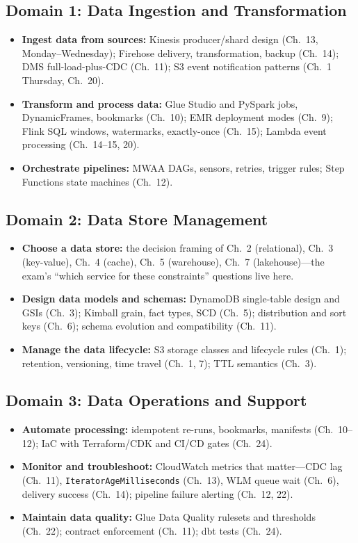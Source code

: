 \subsection{Domain 1: Data Ingestion and Transformation}
\begin{itemize}
    \item \textbf{Ingest data from sources:} Kinesis producer/shard design (Ch.~13, Monday--Wednesday);
    Firehose delivery, transformation, backup (Ch.~14); DMS full-load-plus-CDC (Ch.~11); S3 event
    notification patterns (Ch.~1 Thursday, Ch.~20).
    \item \textbf{Transform and process data:} Glue Studio and PySpark jobs, DynamicFrames,
    bookmarks (Ch.~10); EMR deployment modes (Ch.~9); Flink SQL windows, watermarks, exactly-once
    (Ch.~15); Lambda event processing (Ch.~14--15, 20).
    \item \textbf{Orchestrate pipelines:} MWAA DAGs, sensors, retries, trigger rules; Step
    Functions state machines (Ch.~12).
\end{itemize}
\subsection{Domain 2: Data Store Management}
\begin{itemize}
    \item \textbf{Choose a data store:} the decision framing of Ch.~2 (relational), Ch.~3 (key-value),
    Ch.~4 (cache), Ch.~5 (warehouse), Ch.~7 (lakehouse)---the exam's ``which service for these
    constraints'' questions live here.
    \item \textbf{Design data models and schemas:} DynamoDB single-table design and GSIs (Ch.~3);
    Kimball grain, fact types, SCD (Ch.~5); distribution and sort keys (Ch.~6); schema evolution
    and compatibility (Ch.~11).
    \item \textbf{Manage the data lifecycle:} S3 storage classes and lifecycle rules (Ch.~1);
    retention, versioning, time travel (Ch.~1, 7); TTL semantics (Ch.~3).
\end{itemize}
\subsection{Domain 3: Data Operations and Support}
\begin{itemize}
    \item \textbf{Automate processing:} idempotent re-runs, bookmarks, manifests (Ch.~10--12);
    IaC with Terraform/CDK and CI/CD gates (Ch.~24).
    \item \textbf{Monitor and troubleshoot:} CloudWatch metrics that matter---CDC lag
    (Ch.~11), \texttt{IteratorAgeMilliseconds} (Ch.~13), WLM queue wait (Ch.~6), delivery success
    (Ch.~14); pipeline failure alerting (Ch.~12, 22).
    \item \textbf{Maintain data quality:} Glue Data Quality rulesets and thresholds (Ch.~22);
    contract enforcement (Ch.~11); dbt tests (Ch.~24).
\end{itemize}
